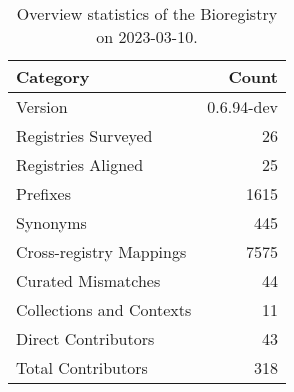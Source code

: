\begin{table}
\centering
\caption{Overview statistics of the Bioregistry on 2023-03-10.}
\label{tab:bioregistry-summary}
\begin{tabular}{lr}
\toprule
                Category &      Count \\
\midrule
                 Version & 0.6.94-dev \\
     Registries Surveyed &         26 \\
      Registries Aligned &         25 \\
                Prefixes &       1615 \\
                Synonyms &        445 \\
 Cross-registry Mappings &       7575 \\
      Curated Mismatches &         44 \\
Collections and Contexts &         11 \\
     Direct Contributors &         43 \\
      Total Contributors &        318 \\
\bottomrule
\end{tabular}
\end{table}
